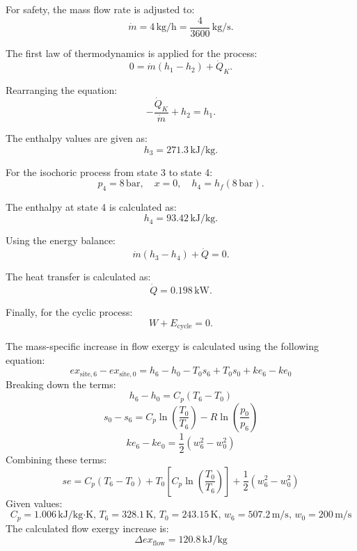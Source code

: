 For safety, the mass flow rate is adjusted to:  
\[
\dot{m} = 4 \, \text{kg/h} = \frac{4}{3600} \, \text{kg/s}.
\]  

The first law of thermodynamics is applied for the process:  
\[
0 = \dot{m}(h_1 - h_2) + \dot{Q}_K.
\]  

Rearranging the equation:  
\[
-\frac{\dot{Q}_K}{\dot{m}} + h_2 = h_1.
\]  

The enthalpy values are given as:  
\[
h_3 = 271.3 \, \text{kJ/kg}.
\]  

For the isochoric process from state 3 to state 4:  
\[
p_4 = 8 \, \text{bar}, \quad x = 0, \quad h_4 = h_f(8 \, \text{bar}).
\]  

The enthalpy at state 4 is calculated as:  
\[
h_4 = 93.42 \, \text{kJ/kg}.
\]  

Using the energy balance:  
\[
\dot{m}(h_3 - h_4) + \dot{Q} = 0.
\]  

The heat transfer is calculated as:  
\[
\dot{Q} = 0.198 \, \text{kW}.
\]  

Finally, for the cyclic process:  
\[
W + E_{\text{cycle}} = 0.
\]

The mass-specific increase in flow exergy is calculated using the following equation:  
\[
ex_{\text{site},6} - ex_{\text{site},0} = h_6 - h_0 - T_0 s_6 + T_0 s_0 + ke_6 - ke_0
\]  
Breaking down the terms:  
\[
h_6 - h_0 = C_p (T_6 - T_0)
\]  
\[
s_0 - s_6 = C_p \ln\left(\frac{T_0}{T_6}\right) - R \ln\left(\frac{p_0}{p_6}\right)
\]  
\[
ke_6 - ke_0 = \frac{1}{2}(w_6^2 - w_0^2)
\]  
Combining these terms:  
\[
se = C_p (T_6 - T_0) + T_0 \left[C_p \ln\left(\frac{T_0}{T_6}\right)\right] + \frac{1}{2}(w_6^2 - w_0^2)
\]  
Given values:  
\[
C_p = 1.006 \, \text{kJ/kg·K}, \, T_6 = 328.1 \, \text{K}, \, T_0 = 243.15 \, \text{K}, \, w_6 = 507.2 \, \text{m/s}, \, w_0 = 200 \, \text{m/s}
\]  
The calculated flow exergy increase is:  
\[
\Delta ex_{\text{flow}} = 120.8 \, \text{kJ/kg}
\]